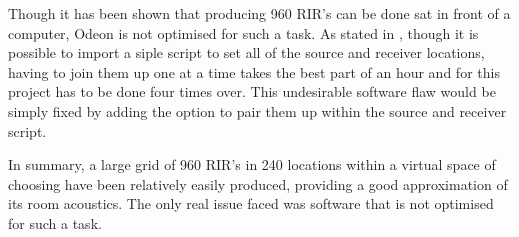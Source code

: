 \documentclass[../../main.tex]{subfiles}
\begin{document}
			Though it has been shown that producing 960 \ac{RIR}'s can be done sat in front of a computer, Odeon is not optimised for such a task. As stated in , though it is possible to import a siple script to set all of the source and receiver locations, having to join them up one at a time takes the best part of an hour and for this project has to be done four times over. This undesirable software flaw would be simply fixed by adding the option to pair them up within the source and receiver script.
			
			In summary, a large grid of 960 \ac{RIR}'s in 240 locations within a virtual space of choosing have been relatively easily produced, providing a good approximation of its room acoustics. The only real issue faced was software that is not optimised for such a task.


	
\end{document}
